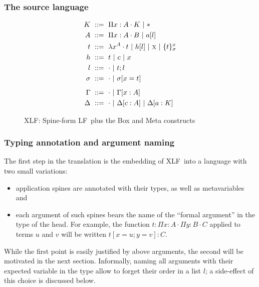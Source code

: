 \documentclass[preprint]{sigplanconf}
\newcommand\gor{\ |\ }
\newcommand\gequal{\ ::=\ }
\newcommand\meta[1]{\textsc{#1}}
\newcommand\mv{x}
\newcommand\mmeta{\meta x}
\newcommand\postbinder{\cdot}
\newcommand\prd[2]{\Pi{#1}:{#2}\postbinder}
\newcommand\tlam[2]{\lambda{#1}^{#2}\postbinder}
\newcommand\lam{\tlam}
\newcommand\obox[3]{\{{#1}\}^{#2}_{#3}}
\newcommand\srt[1]{\mathsf{#1}}
\newcommand\type{\srt *}
\newcommand\lapp[2]{{#1}[{#2}]}
\newcommand\laapp[3]{{#1}[{#2}]:{#3}}
\newcommand\lnil{\cdot}
\newcommand\lcons[2]{{#1};{#2}}
\newcommand\lncons[3]{{#1}={#2};{#3}}
\newcommand\lnsing[2]{{#1}={#2}}
\newcommand\enil\cdot
\newcommand\eent[1]{[{#1}]}
\newcommand\econs[2]{{#1}\eent{#2}}
\newcommand\ebinddecl[3]{\econs{#1}{{#2}:{#3}}}
\newcommand\snil\enil
\newcommand\sent[2]{[{#1}={#2}]}
\newcommand\scons[3]{{#1}\sent{#2}{#3}}
\newcommand\lang[1]{\textsf{#1}}
\newcommand\LF{\lang{LF}}
\newcommand\XLF{\lang{XLF}}
\newcommand\XLFmod[1]{#1}
\def\thelangmod{UNDEFINED}
\newcommand\mk{\thelangmod{K}}
\newcommand\mf{\thelangmod{A}}
\newcommand\mmf{\thelangmod{B}}
\newcommand\mo{\thelangmod{t}}
\newcommand\mh{\thelangmod{h}}
\newcommand\ma{\thelangmod{l}}
\newcommand\ms{\thelangmod{\sigma}}
\newcommand\me{\thelangmod{\Gamma}}
\newcommand\msi{\thelangmod{\Delta}}
\newcommand\mco{\thelangmod{c}}
\newcommand\mcf{\thelangmod{a}}
\begin{document}
\subsubsection{The source language}

\begin{figure}
  \def\thelangmod{\XLFmod}
  \begin{align*}
    \mk &\gequal { \prd\mv\mf\mk \gor \type } \\
    \mf &\gequal { \prd\mv\mf\mmf \gor \lapp\mcf\ma } \\
    \mo &\gequal { \lam\mv\mf\mo \gor \lapp\mh\ma \gor \mmeta \gor \obox\mo\mv\ms } \\
    \mh &\gequal { \mo \gor \mco \gor \mv } \\
    \ma &\gequal { \lnil \gor \lcons\mo\ma } \\
    \ms &\gequal { \snil \gor \scons \sigma\mv\mo } \\[0.5em]
    \me &\gequal { \enil \gor \ebinddecl \Gamma\mv\mf } \\
    \msi &\gequal { \enil \gor \ebinddecl\msi\mco\mf \gor
      \ebinddecl\msi\mcf\mk }
  \end{align*}
  \caption{\XLF: Spine-form \LF\ plus the \textsf{Box} and \textsf{Meta} constructs}
\end{figure}

\subsubsection{Typing annotation and argument naming}

The first step in the translation is the embedding of \XLF\ into a
language with two small variations:
\begin{itemize}
\item application spines are annotated with their types, as well as
  metavariables and
\item each argument of such spines bears the name of the ``formal
  argument'' in the type of the head. For example, the function $t :
  \prd x A \prd y B C$ applied to terms $u$ and $v$ will be written
  $\laapp{t}{\lncons x u {\lnsing y v}} C$.
\end{itemize}

While the first point is easily justified by above arguments, the
second will be motivated in the next section. Informally, naming all
arguments with their expected variable in the type allow to forget
their order in a list $l$; a side-effect of this choice is discussed
below.
\end{document}
